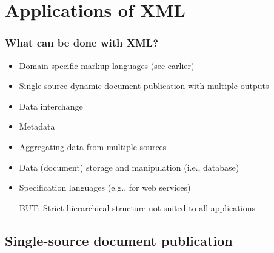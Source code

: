 

\section{Applications of XML}




\frame
{
	\frametitle{What can be done with XML?}
	
	\begin{itemize}
	
		\item Domain specific markup languages (see earlier)

		\item Single-source dynamic document publication with multiple
		outputs
		
		\item Data interchange
		
		
		\item Metadata

		\item Aggregating data from multiple sources

		\item Data (document) storage and manipulation (i.e., database)
		
		\item Specification languages (e.g., for web services)
		
		\item[\alert{BUT:}] Strict hierarchical structure not suited to
		all applications

	\end{itemize}
	
}





\subsection*{Single-source document publication}




